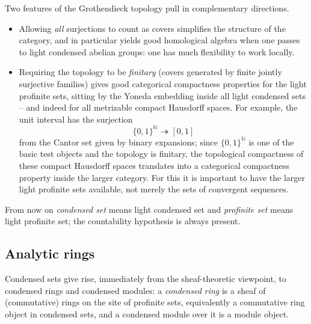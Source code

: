 \begin{remark}
\label{rmk:1:covers-and-finitary}
Two features of the Grothendieck topology pull in complementary directions.
\begin{itemize}
\item Allowing \emph{all} surjections to count as covers simplifies the structure
of the category, and in particular yields good homological algebra when one
passes to light condensed abelian groups: one has much flexibility to work
locally.
\item Requiring the topology to be \emph{finitary} (covers generated by finite
jointly surjective families) gives good categorical compactness properties for
the light profinite sets, sitting by the Yoneda embedding inside all light
condensed sets -- and indeed for all metrizable compact Hausdorff spaces. For
example, the unit interval has the surjection
\begin{equation*}
\{0,1\}^{\mathbb{N}}\twoheadrightarrow [0,1]
\end{equation*}
from the Cantor set given by binary expansions; since $\{0,1\}^{\mathbb{N}}$ is
one of the basic test objects and the topology is finitary, the topological
compactness of these compact Hausdorff spaces translates into a categorical
compactness property inside the larger category. For this it is important to have
the larger light profinite sets available, not merely the sets of convergent
sequences.
\end{itemize}
\end{remark}

\begin{notation}
\label{not:1:drop-light}
From now on \emph{condensed set} means light condensed set and \emph{profinite
set} means light profinite set; the countability hypothesis is always present.
\end{notation}

\subsection{Analytic rings}

Condensed sets give rise, immediately from the sheaf-theoretic viewpoint, to
condensed rings and condensed modules: a \emph{condensed ring} is a sheaf of
(commutative) rings on the site of profinite sets, equivalently a commutative
ring object in condensed sets, and a condensed module over it is a module object.

